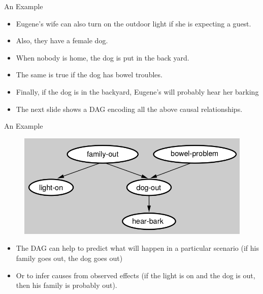 \documentclass[handout]{beamer}
\begin{document}
\begin{frame}{An Example}
\scriptsize{
\begin{itemize}

\item Eugene's wife can also turn on the outdoor light if she is expecting a guest.

\item Also, they have a female dog. 

\item When nobody is home, the dog is put in the back yard. 

\item The same is true if the dog has bowel troubles. 

\item Finally, if the dog is in the backyard, Eugene's will probably hear her barking 

\item The next slide shows a DAG encoding all the above causal relationships.

 
\end{itemize}



} 

\end{frame}


\begin{frame}{An Example}
\scriptsize{

\begin{figure}[h!]
	\centering
	\includegraphics[scale=0.4]{pics/fodag.png}
	\end{figure} 

\begin{itemize}

\item The DAG can help to predict what will happen in a particular scenario (if his family goes out, the dog goes out) 
\item Or to infer causes from observed effects (if the light is on and the dog is out, then his family is probably out).



 
\end{itemize}



} 

\end{frame}
\end{document}
